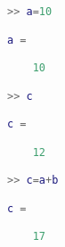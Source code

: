 \begin{lstlisting}[language=matlab]
>> a=10

a =

    10

>> c

c =

    12

>> c=a+b

c =

    17

\end{lstlisting}